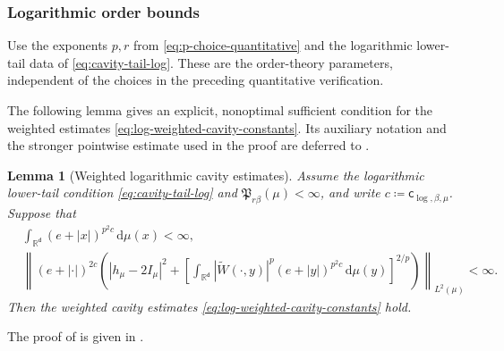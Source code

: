 \documentclass[11pt,reqno]{amsart}
\numberwithin{equation}{section}
\theoremstyle{plain}
\newtheorem{lemma}[lemma]{Lemma}
\theoremstyle{remark}
\renewcommand{\d}{\mathsf{d}}
\newcommand{\md}{\mathrm{d}}
\newcommand{\R}{{\mathbb{R}}}
\newcommand{\tl}{\widetilde}
\newcommand{\be}{\beta}
\begin{document}
\subsubsection{Logarithmic order bounds}
\label{subsubsec:logarithmic-order-application}

Use the exponents $p,r$ from \eqref{eq:p-choice-quantitative} and the logarithmic lower-tail data of \eqref{eq:cavity-tail-log}.  These are the order-theory parameters, independent of the choices in the preceding quantitative verification.

The following lemma gives an explicit, nonoptimal sufficient condition for the weighted estimates \eqref{eq:log-weighted-cavity-constants}.  Its auxiliary notation and the stronger pointwise estimate used in the proof are deferred to .

\begin{lemma}[Weighted logarithmic cavity estimates]\label{lem:weighted-logarithmic-cavity}
Assume the logarithmic lower-tail condition \eqref{eq:cavity-tail-log} and \(\mathfrak P_{r\be}(\mu)<\infty\), and write \(c\coloneqq\mathsf c_{\log,\be,\mu}\).  Suppose that
\begin{subequations}\label{eq:weighted-logarithmic-inputs}
\begin{align}
 &\int_{\R^\d}(e+|x|)^{p^2c}\,\md\mu(x)<\infty,\label{eq:weighted-logarithmic-moment}\\
 &\left\|(e+|\cdot|)^{2c}
 \left(
 |h_\mu-2I_\mu|^2
 +\left[\int_{\R^\d}|\tl W(\cdot,y)|^p(e+|y|)^{p^2c}\,\md\mu(y)\right]^{2/p}
 \right)\right\|_{L^2(\mu)}<\infty.\label{eq:weighted-logarithmic-section}
\end{align}
\end{subequations}
Then the weighted cavity estimates \eqref{eq:log-weighted-cavity-constants} hold.
\end{lemma}

The proof of  is given in .
\end{document}
